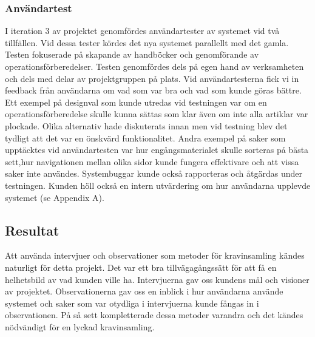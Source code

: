 
\subsubsection{Användartest}
I iteration 3 av projektet genomfördes användartester av systemet vid två tillfällen. Vid dessa tester kördes det nya systemet parallellt med det gamla. Testen fokuserade på skapande av handböcker och genomförande av operationsförberedelser. Testen genomfördes dels på egen hand av verksamheten och dels med delar av projektgruppen på plats. Vid användartesterna fick vi in feedback från användarna om vad som var bra och vad som kunde göras bättre. Ett exempel på designval som kunde utredas vid testningen var om en operationsförberedelse skulle kunna sättas som klar även om inte alla artiklar var plockade. Olika alternativ hade diskuterats innan men vid testning blev det tydligt att det var en önskvärd funktionalitet. Andra exempel på saker som upptäcktes vid användartesten var hur engångsmaterialet skulle sorteras på bästa sett,hur navigationen mellan olika sidor kunde fungera effektivare och att vissa saker inte användes.
Systembuggar kunde också rapporteras och åtgärdas under testningen.
Kunden höll också en intern utvärdering om hur användarna upplevde systemet (se Appendix A).


\subsection{Resultat}
Att använda intervjuer och observationer som metoder för kravinsamling kändes naturligt för detta projekt. Det var ett bra tillvägagångssätt för att få en helhetsbild av vad kunden ville ha. Intervjuerna gav oss kundens mål och visioner av projektet. Observationerna gav oss en inblick i hur användarna använde systemet och saker som var otydliga i intervjuerna kunde fångas in i observationen. På så sett kompletterade dessa metoder varandra och det kändes nödvändigt för en lyckad kravinsamling.

